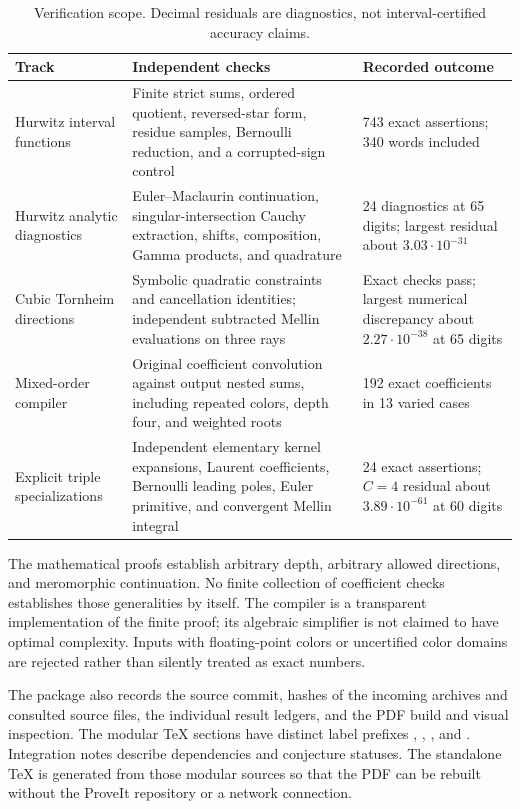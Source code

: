 \begin{table}[htbp]
\centering\small
\begin{tabular}{@{}L{0.23\textwidth}L{0.46\textwidth}L{0.24\textwidth}@{}}
\toprule
Track & Independent checks & Recorded outcome \\
\midrule
Hurwitz interval functions
& Finite strict sums, ordered quotient, reversed-star form, residue
  samples, Bernoulli reduction, and a corrupted-sign control
& 743 exact assertions; 340 words included \\
\addlinespace
Hurwitz analytic diagnostics
& Euler--Maclaurin continuation, singular-intersection Cauchy
  extraction, shifts, composition, Gamma products, and quadrature
& 24 diagnostics at 65 digits; largest residual about
  $3.03\cdot10^{-31}$ \\
\addlinespace
Cubic Tornheim directions
& Symbolic quadratic constraints and cancellation identities;
  independent subtracted Mellin evaluations on three rays
& Exact checks pass; largest numerical discrepancy about
  $2.27\cdot10^{-38}$ at 65 digits \\
\addlinespace
Mixed-order compiler
& Original coefficient convolution against output nested sums,
  including repeated colors, depth four, and weighted roots
& 192 exact coefficients in 13 varied cases \\
\addlinespace
Explicit triple specializations
& Independent elementary kernel expansions, Laurent coefficients,
  Bernoulli leading poles, Euler primitive, and convergent Mellin integral
& 24 exact assertions; $C=4$ residual about $3.89\cdot10^{-61}$
  at 60 digits \\
\bottomrule
\end{tabular}
\caption{Verification scope. Decimal residuals are diagnostics, not
interval-certified accuracy claims.}\label{audit:checks}
\end{table}

The mathematical proofs establish arbitrary depth, arbitrary allowed
directions, and meromorphic continuation. No finite collection of
coefficient checks establishes those generalities by itself. The
compiler is a transparent implementation of the finite proof;
its algebraic simplifier is not claimed to have optimal complexity.
Inputs with floating-point colors or uncertified color domains are
rejected rather than silently treated as exact numbers.

The package also records the source commit, hashes of the incoming
archives and consulted source files, the individual result ledgers,
and the PDF build and visual inspection. The modular TeX sections
have distinct label prefixes , , ,
and . Integration notes describe dependencies and
conjecture statuses. The standalone TeX is generated from those
modular sources so that the PDF can be rebuilt without the ProveIt
repository or a network connection.
